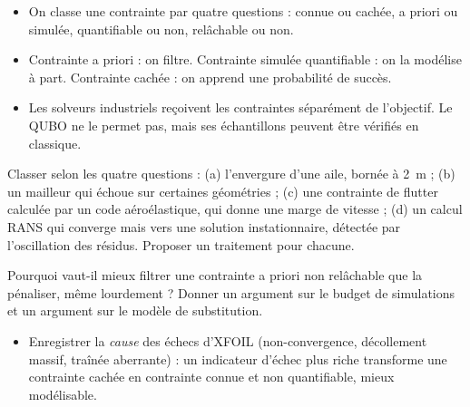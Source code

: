 \begin{resultat}
\begin{itemize}
\item On classe une contrainte par quatre questions : connue ou cachée, a priori ou simulée, quantifiable ou non, relâchable ou non.
\item Contrainte a priori : on filtre. Contrainte simulée quantifiable : on la modélise à part. Contrainte cachée : on apprend une probabilité de succès.
\item Les solveurs industriels reçoivent les contraintes séparément de l'objectif. Le QUBO ne le permet pas, mais ses échantillons peuvent être vérifiés en classique.
\end{itemize}
\end{resultat}

\exercices
\begin{exercice}\label{ex:taxo-classer}
Classer selon les quatre questions : (a) l'envergure d'une aile, bornée à 2~m ; (b) un mailleur qui échoue sur certaines géométries ; (c) une contrainte de flutter calculée par un code aéroélastique, qui donne une marge de vitesse ; (d) un calcul RANS qui converge mais vers une solution instationnaire, détectée par l'oscillation des résidus. Proposer un traitement pour chacune.
\end{exercice}
\begin{exercice}\label{ex:taxo-filtre}
Pourquoi vaut-il mieux filtrer une contrainte a priori non relâchable que la pénaliser, même lourdement ? Donner un argument sur le budget de simulations et un argument sur le modèle de substitution.
\end{exercice}

\begin{pistes}
\begin{itemize}
\item Enregistrer la \emph{cause} des échecs d'XFOIL (non-convergence, décollement massif, traînée aberrante) : un indicateur d'échec plus riche transforme une contrainte cachée en contrainte connue et non quantifiable, mieux modélisable.
\end{itemize}
\end{pistes}
